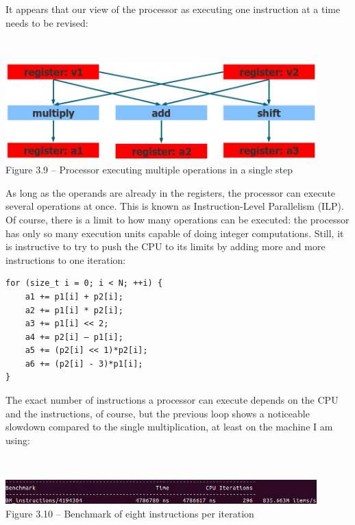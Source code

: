 It appears that our view of the processor as executing one instruction at a time needs to be revised:

\hspace*{\fill} \\ %
\begin{center}
\includegraphics[width=0.9\textwidth]{content/1/chapter3/images/9.jpg}\\
Figure 3.9 – Processor executing multiple operations in a single step
\end{center}

As long as the operands are already in the registers, the processor can execute several operations at once. This is known as Instruction-Level Parallelism (ILP). Of course, there is a limit to how many operations can be executed: the processor has only so many execution units capable of doing integer computations. Still, it is instructive to try to push the CPU to its limits by adding more and more instructions to one iteration:

\begin{lstlisting}[style=styleCXX]
for (size_t i = 0; i < N; ++i) {
	a1 += p1[i] + p2[i];
	a2 += p1[i] * p2[i];
	a3 += p1[i] << 2;
	a4 += p2[i] – p1[i];
	a5 += (p2[i] << 1)*p2[i];
	a6 += (p2[i] - 3)*p1[i];
}
\end{lstlisting}

The exact number of instructions a processor can execute depends on the CPU and the instructions, of course, but the previous loop shows a noticeable slowdown compared to the single multiplication, at least on the machine I am using:

\hspace*{\fill} \\ %
\begin{center}
\includegraphics[width=0.9\textwidth]{content/1/chapter3/images/10.jpg}\\
Figure 3.10 – Benchmark of eight instructions per iteration
\end{center}

